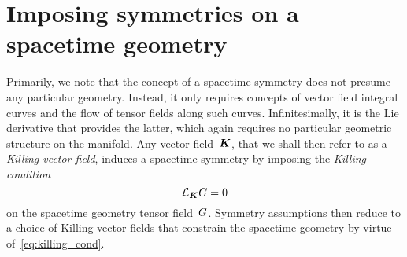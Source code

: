 \section{Imposing symmetries on a spacetime geometry}\label{sec:symm_geom}

Primarily, we note that the concept of a spacetime symmetry does not presume any particular geometry. Instead, it only requires concepts of vector field integral curves and the flow of tensor fields along such curves. Infinitesimally, it is the Lie derivative that provides the latter, which again requires no particular geometric structure on the manifold. Any vector field~$\boldsymbol{K}$, that we shall then refer to as a \emph{Killing vector field}, induces a spacetime symmetry by imposing the \emph{Killing condition}
\begin{equation}\label{eq:killing_cond}
	\mathcal{L}_{\boldsymbol{K}} G=0
\end{equation}
on the spacetime geometry tensor field~$G$. Symmetry assumptions then reduce to a choice of Killing vector fields that constrain the spacetime geometry by virtue of~\eqref{eq:killing_cond}.


